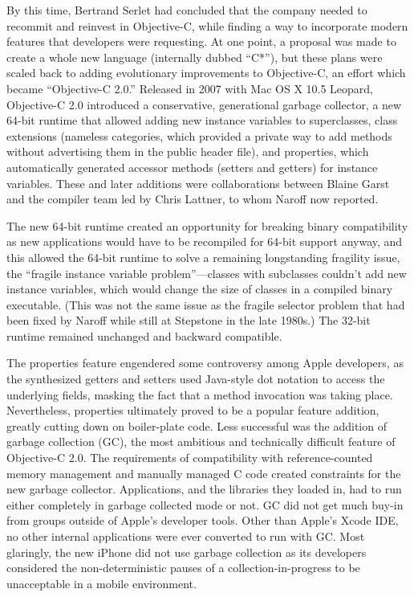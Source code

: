 \documentclass[acmsmall,screen]{acmart}
\begin{document}
By this time, Bertrand Serlet had concluded that the company needed to recommit and reinvest in Objective-C, while finding a way to incorporate modern features that developers were requesting. At one point, a proposal was made to create a whole new language (internally dubbed ``C*''), but these plans were scaled back to adding evolutionary improvements to Objective-C, an effort which became ``Objective-C 2.0.'' Released in 2007 with Mac OS X 10.5 Leopard, Objective-C 2.0 introduced a conservative, generational garbage collector, a new 64-bit runtime that allowed adding new instance variables to superclasses, class extensions (nameless categories, which provided a private way to add methods without advertising them in the public header file), and properties, which automatically generated accessor methods (setters and getters) for instance variables. These and later additions were collaborations between Blaine Garst and the compiler team led by Chris Lattner, to whom Naroff now reported.

The new 64-bit runtime created an opportunity for breaking binary compatibility as new applications would have to be recompiled for 64-bit support anyway, and this allowed the 64-bit runtime to solve a remaining longstanding fragility issue, the ``fragile instance variable problem''---classes with subclasses couldn't add new instance variables, which would change the size of classes in a compiled binary executable. (This was not the same issue as the fragile selector problem that had been fixed by Naroff while still at Stepstone in the late 1980s.) The 32-bit runtime remained unchanged and backward compatible.

The properties feature engendered some controversy among Apple developers, as the synthesized getters and setters used Java-style dot notation to access the underlying fields, masking the fact that a method invocation was taking place. Nevertheless, properties ultimately proved to be a popular feature addition, greatly cutting down on boiler-plate code. Less successful was the addition of garbage collection (GC), the most ambitious and technically difficult feature of Objective-C 2.0. The requirements of compatibility with reference-counted memory management and manually managed C code created constraints for the new garbage collector. Applications, and the libraries they loaded in, had to run either completely in garbage collected mode or not. GC did not get much buy-in from groups outside of Apple's developer tools. Other than Apple's Xcode IDE, no other internal applications were ever converted to run with GC. Most glaringly, the new iPhone did not use garbage collection as its developers considered the non-deterministic pauses of a collection-in-progress to be unacceptable in a mobile environment.
\end{document}
